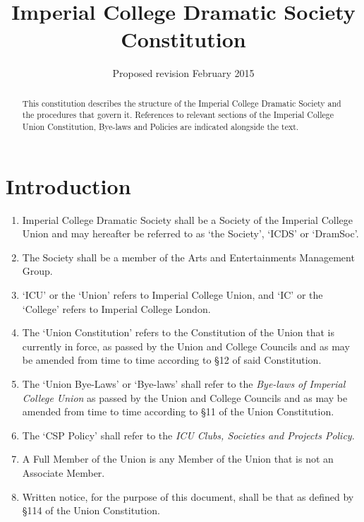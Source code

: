 \documentclass[a4paper]{tufte-handout}
\title{Imperial College Dramatic Society Constitution}
\date{Proposed revision February 2015}
\newcommand{\policyOffset}{12pt}
\newcommand{\policyCspp}[2][\policyOffset]{\marginnote[#1]{\textsc{CSP Policy \S#2}}}
\begin{document}
\maketitle

\begin{fullwidth}
\itshape

\begin{abstract}
This constitution describes the structure of the Imperial College Dramatic Society and the procedures that govern it.
References to relevant sections of the Imperial College Union Constitution, Bye-laws and Policies are indicated alongside the text.
\end{abstract}
\end{fullwidth}

\hdashrule{15cm}{1.1pt}{1.1pt}

\section{Introduction}
\begin{enumerate}
    \item Imperial College Dramatic Society shall be a Society of the Imperial College Union and may hereafter be referred to as `the Society', `ICDS' or `DramSoc'.
    \item \policyCspp{33} The Society shall be a member of the Arts and Entertainments Management Group.
    \item `ICU' or the `Union' refers to Imperial College Union, and `IC' or the `College' refers to Imperial College London.
    \item The `Union Constitution' refers to the Constitution of the Union that is currently in force, as passed by the Union and College Councils and as may be amended from time to time according to \S12 of said Constitution.
    \item The `Union Bye-Laws' or `Bye-laws' shall refer to the \textit{Bye-laws of Imperial College Union} as passed by the Union and College Councils and as may be amended from time to time according to \S11 of the Union Constitution.
    \item The `CSP Policy' shall refer to the \textit{ICU Clubs, Societies and Projects Policy}.
    \item A Full Member of the Union is any Member of the Union that is not an Associate Member.
    \item Written notice, for the purpose of this document, shall be that as defined by \S114 of the Union Constitution.
\end{enumerate}
\end{document}
